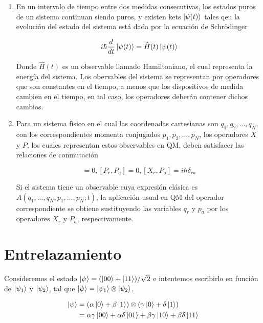 \begin{enumerate}
    \item En un intervalo de tiempo entre dos medidas consecutivas, los estados puros de un sistema continuan siendo puros, y existen kets $\ket{\psi(t)}$ tales qeu la evolución del estado del sistema está dada por la ecuación de Schrödinger

        \begin{equation}
            i \hbar \frac{d}{dt} \ket{\psi(t)} = \hat{H}(t) \ket{\psi(t)}
        \end{equation}

        Donde $\hat{H}(t)$ es un observable llamado Hamiltoniano, el cual representa la energía del sistema. Los obervables del sistema se representan por operadores que son constantes en el tiempo, a menos que los dispositivos de medida cambien en el tiempo, en tal caso, los operadores deberán contener dichos cambios.
    \item Para un sistema físico en el cual las coordenadas cartesianas son $q_1, q_2, ... , q_N$, con los correspondientes momenta conjugados $p_1, p_2, ... , p_N$, los operadores $X$ y $P$, los cuales representan estos observables en QM, deben satisfacer las relaciones de conmutación

        \begin{equation}
            [X_r, X_a] = 0, [P_r, P_a] = 0, [X_r, P_a] = i \hbar \delta_{ra}
        \end{equation}

        Si el sistema tiene un observable cuya expresión clásica es $A(q_1, ... , q_N, p_1, ... , p_N; t)$, la aplicación usual en QM del operador correspondiente se obtiene sustituyendo las variables $q_r$ y $p_a$ por los operadores $X_r$ y $P_a$, respectivamente.
\end{enumerate}

\section{Entrelazamiento}

Consideremos el estado $\ket{\psi} = (\ket{00} + \ket{11})/\sqrt{2}$ e intentemos escribirlo en función de $\ket{\psi_1}$ y $\ket{\psi_2}$, tal que $\ket{\psi} = \ket{\psi_1} \otimes \ket{\psi_2}$.

\begin{align*}
    \ket{\psi}
    &= (\alpha \ket{0} + \beta \ket{1}) \otimes (\gamma \ket{0} + \delta \ket{1}) \\
    &= \alpha \gamma \ket{00} + \alpha \delta \ket{01} + \beta \gamma \ket{10} + \beta \delta \ket{11}
\end{align*}

